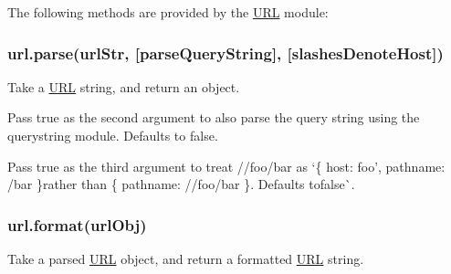 The following methods are provided by the \mbox{\hyperlink{namespace_u_r_l}{U\+RL}} module\+:

\subsubsection*{url.\+parse(url\+Str, \mbox{[}parse\+Query\+String\mbox{]}, \mbox{[}slashes\+Denote\+Host\mbox{]})}

Take a \mbox{\hyperlink{namespace_u_r_l}{U\+RL}} string, and return an object.

Pass {\ttfamily true} as the second argument to also parse the query string using the {\ttfamily querystring} module. Defaults to {\ttfamily false}.

Pass {\ttfamily true} as the third argument to treat {\ttfamily //foo/bar} as `\{ host\+: \textquotesingle{}foo', pathname\+: \textquotesingle{}/bar\textquotesingle{} \}{\ttfamily rather than }\{ pathname\+: \textquotesingle{}//foo/bar\textquotesingle{} \}{\ttfamily . Defaults to}false\`{}.

\subsubsection*{url.\+format(url\+Obj)}

Take a parsed \mbox{\hyperlink{namespace_u_r_l}{U\+RL}} object, and return a formatted \mbox{\hyperlink{namespace_u_r_l}{U\+RL}} string.



